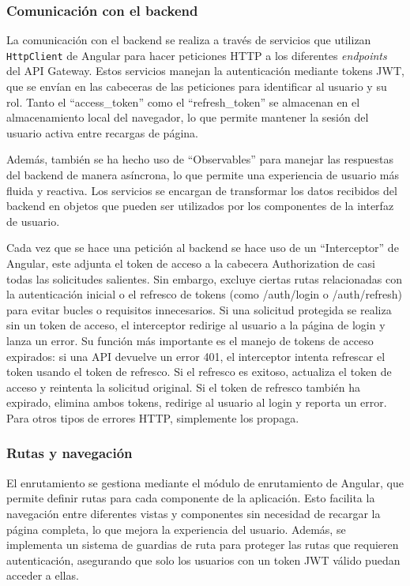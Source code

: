 \subsubsection{Comunicación con el backend}
La comunicación con el backend se realiza a través de servicios que utilizan \texttt{HttpClient} de Angular para hacer peticiones HTTP a los diferentes \textit{endpoints} del API Gateway. Estos servicios manejan la autenticación mediante tokens JWT, que se envían en las cabeceras de las peticiones para identificar al usuario y su rol. Tanto el ``access\_token'' como el ``refresh\_token'' se almacenan en el almacenamiento local del navegador, lo que permite mantener la sesión del usuario activa entre recargas de página.

Además, también se ha hecho uso de ``Observables'' para manejar las respuestas del backend de manera asíncrona, lo que permite una experiencia de usuario más fluida y reactiva. Los servicios se encargan de transformar los datos recibidos del backend en objetos que pueden ser utilizados por los componentes de la interfaz de usuario.

Cada vez que se hace una petición al backend se hace uso de un ``Interceptor'' de Angular, este adjunta el token de acceso a la cabecera Authorization de casi todas las solicitudes salientes. Sin embargo, excluye ciertas rutas relacionadas con la autenticación inicial o el refresco de tokens (como /auth/login o /auth/refresh) para evitar bucles o requisitos innecesarios.
Si una solicitud protegida se realiza sin un token de acceso, el interceptor redirige al usuario a la página de login y lanza un error. Su función más importante es el manejo de tokens de acceso expirados: si una API devuelve un error 401, el interceptor intenta refrescar el token usando el token de refresco. Si el refresco es exitoso, actualiza el token de acceso y reintenta la solicitud original. Si el token de refresco también ha expirado, elimina ambos tokens, redirige al usuario al login y reporta un error. Para otros tipos de errores HTTP, simplemente los propaga.
\subsubsection{Rutas y navegación}
El enrutamiento se gestiona mediante el módulo de enrutamiento de Angular, que permite definir rutas para cada componente de la aplicación. Esto facilita la navegación entre diferentes vistas y componentes sin necesidad de recargar la página completa, lo que mejora la experiencia del usuario. Además, se implementa un sistema de guardias de ruta para proteger las rutas que requieren autenticación, asegurando que solo los usuarios con un token JWT válido puedan acceder a ellas.
